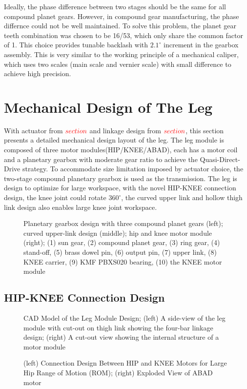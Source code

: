  Ideally, the phase difference between two stages should be the same for all compound planet gears. However, in compound gear manufacturing, the phase differnce could not be well maintained. To solve this problem, the planet gear teeth combination was chosen to be 16/53, which only share the common factor of 1. This choice provides tunable backlash with $2.1^{\circ}$ increment in the gearbox assembly. This is very similar to the working principle of a mechanical caliper, which uses two scales (main scale and vernier scale) with small difference to achieve high precision.

\section{\textbf{Mechanical Design of The Leg}}
\label{sec:LegDesign}

With actuator from $\color{red}section$ and linkage design from $\color{red}section$, this section presents a detailed mechanical design layout of the leg. The leg module is composed of three motor modules(HIP/KNEE/ABAD), each has a motor coil and a planetary gearbox with moderate gear ratio to achieve the Quasi-Direct-Drive\cite{20162016} strategy. To accommodate size limitation imposed by actuator choice, the two-stage compound planetary gearbox is used as the transmission. The leg is design to optimize for large workspace, with the novel HIP-KNEE connection design, the knee joint could rotate $360^{\circ}$, the curved upper link and hollow thigh link design also enables large knee joint workspace.
  
\begin{figure}
	\centering
	\caption{Planetary gearbox design with three compound planet gears (left); curved upper-link design (middle); hip and knee motor module (right); (1) sun gear, (2) compound planet gear, (3) ring gear, (4) stand-off, (5) brass dowel pin, (6) output pin, (7) upper link, (8) KNEE carrier, (9) KMF PBXS020 bearing, (10) the KNEE motor module}
	\label{fig:gearbox}
\end{figure}



\subsection{\textbf{HIP-KNEE Connection Design}}
\label{sec:Design4ROM}

\begin{figure}
	\centering
	\caption{CAD Model of the Leg Module Design; (left) A side-view of the leg module with cut-out on thigh link showing the four-bar linkage design; (right) A cut-out view showing the internal structure of a motor module}
	\label{fig:LegDesign}
\end{figure}
\begin{figure}
	\centering
	\caption{(left) Connection Design Between HIP and KNEE Motors for Large Hip Range of Motion (ROM); (right) Exploded View of ABAD motor}
	\label{fig:KMFbearings}
\end{figure}

